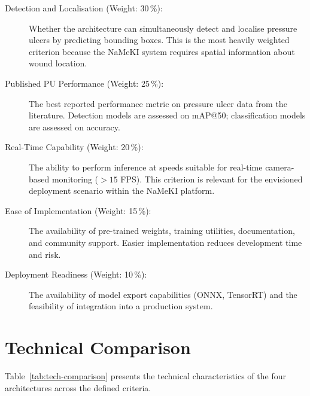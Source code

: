 \documentclass[a4paper,12pt,twoside]{report}
\begin{document}
\begin{description}
  \item[Detection and Localisation (Weight: 30\,\%):] Whether the architecture
    can simultaneously detect and localise pressure ulcers by predicting bounding
    boxes. This is the most heavily weighted criterion because the NaMeKI system
    requires spatial information about wound location.

  \item[Published PU Performance (Weight: 25\,\%):] The best reported
    performance metric on pressure ulcer data from the literature. Detection
    models are assessed on mAP@50; classification models are assessed on accuracy.

  \item[Real-Time Capability (Weight: 20\,\%):] The ability to perform inference
    at speeds suitable for real-time camera-based monitoring ($>15$ FPS). This
    criterion is relevant for the envisioned deployment scenario within the
    NaMeKI platform.

  \item[Ease of Implementation (Weight: 15\,\%):] The availability of
    pre-trained weights, training utilities, documentation, and community
    support. Easier implementation reduces development time and risk.

  \item[Deployment Readiness (Weight: 10\,\%):] The availability of model export
    capabilities (ONNX, TensorRT) and the feasibility of integration into a
    production system.
\end{description}

\section{Technical Comparison}
\label{sec:tech-comparison}

Table~\ref{tab:tech-comparison} presents the technical characteristics of the
four architectures across the defined criteria.
\end{document}
